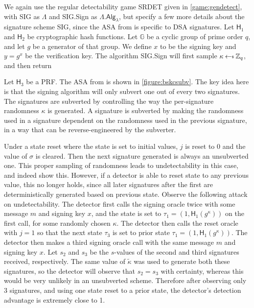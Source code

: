 We again use the regular detectability game SRDET given in \autoref{game:gendetect}, with \textsf{SIG} as $\mathsf{\Lambda}$ and \textsf{SIG.Sign} as $\mathsf{\Lambda.Alg}_\lambda$, but specify a few more details about the signature scheme \textsf{SIG}, since the ASA from \cite{BSKC2019} is specific to DSA signatures. Let $\textsf{H}_1$ and $\textsf{H}_2$ be cryptographic hash functions. Let $\mathbb{G}$ be a cyclic group of prime order $q$, and let $g$ be a generator of that group. We define $x$ to be the signing key and $y=g^x$ be the verification key. The algorithm \textsf{SIG.Sign} will first sample $\kappa \sample \mathbb{Z}_q$, and then return

Let $\mathsf{H}_3$ be a PRF. The ASA from \cite{BSKC2019} is shown in \autoref{figure:bskcsubv}. The key idea here is that the signing algorithm will only subvert one out of every two signatures. The signatures are subverted by controlling the way the per-signature randomness $\kappa$ is generated. A signature is subverted by making the randomness used in a signature dependent on the randomness used in the previous signature, in a way that can be reverse-engineered by the subverter.

Under a state reset where the state is set to initial values, $j$ is reset to 0 and the value of $\sigma$ is cleared. Then the next signature generated is always an unsubverted one. This proper sampling of randomness leads to undetectability in this case, and indeed \cite{BSKC2019} show this. However, if a detector is able to reset state to any previous value, this no longer holds, since all later signatures after the first are deterministically generated based on previous state. Observe the following attack on undetectability. The detector first calls the signing oracle twice with some message $m$ and signing key $x$, and the state is set to $\tau_1 = (1, \textsf{H}_1(g^\kappa))$ on the first call, for some randomly chosen $\kappa$. The detector then calls the reset oracle with $j=1$ so that the next state $\tau_3$ is set to prior state $\tau_1 = (1, \textsf{H}_1(g^\kappa))$. The detector then makes a third signing oracle call with the same message $m$ and signing key $x$. Let $s_2$ and $s_3$ be the $s$-values of the second and third signatures received, respectively. The same value of $\tilde{\kappa}$ was used to generate both these signatures, so the detector will observe that $s_2=s_3$ with certainty, whereas this would be very unlikely in an unsubverted scheme. Therefore after observing only 3 signatures, and using one state reset to a prior state, the detector's detection advantage is extremely close to 1.



